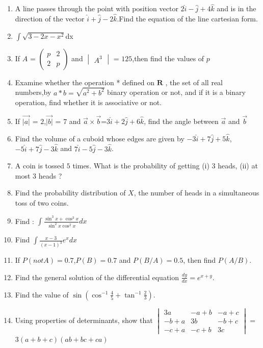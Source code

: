 \documentclass[12pt,-letter paper]{article}
\providecommand{\brak}[1]{\ensuremath{\left(#1\right)}}
\theoremstyle{remark}
\newcommand{\myvec}[1]{\ensuremath{\begin{pmatrix}#1\end{pmatrix}}}
\newcommand{\mydet}[1]{\ensuremath{\begin{vmatrix}#1\end{vmatrix}}}
\begin{document}
\begin{enumerate}
\item A line passes through the point with position vector $2\hat{i}-\hat{j}+4\hat{k}$
and is in the direction of the vector $\hat{i}+\hat{j}-2\hat{k}$.Find the equation of the line cartesian form.

\item $\int{\sqrt{3-2x-x^2}}$dx

\item If $A$ = $\myvec{p&2 \\ 2&p}$ and $\mydet{A^3}$ = $125$,then find the values of $p$

\item Examine whether the operation * defined on $\textbf{R}$ , the set of all real numbers,by $a *b = \sqrt{a^2+b^2}$ binary operation or not, and if it is a binary operation, find whether it is associative or not.

\item If $\overrightarrow{|a|}$ = $2$,$\overrightarrow{|b|}$ = $7$ and 
$\overrightarrow{a}\times\overrightarrow{b}$=$3\hat{i}+2\hat{j}+6\hat{k}$, find the angle between $\overrightarrow{a}$ and $\overrightarrow{b}$

\item Find the volume of a cuboid whose edges are given by $-3\hat{i}+7\hat{j}+5\hat{k}$,$-5\hat{i}+7\hat{j}-3\hat{k}$ and $7\hat{i}-5\hat{j}-3\hat{k}$.

\item A coin is tossed $5$ times. What is the probability of getting (i) $3$ heads,
(ii) at most $3$ heads ?

\item Find the probability distribution of $X$, the number of heads in a
simultaneous toss of two coins.

\item Find : $\int{\frac{\sin^3{x}+\cos^3{x}}{\sin^2{x}\cos^2{x}}}dx$

\item Find $\int{\frac{x-3}{\brak{x-1}^3}}e^x dx$

\item If $P(not A) =0.7$,$P(B)=0.7$ and $P(B/A)=0.5$, then find $P(A/B)$.

\item Find the general solution of the differential equation $\frac{dy}{dx} = e^{x+y}$.

\item Find the value of $\sin\brak{\cos^{-1}{\frac{4}{5}}+{\tan^{-1}{\frac{2}{3}}}}$.

\item Using properties of determinants, show that \mydet{3a & -a+b & -a+c \\ -b+a & 3b & -b+c \\ -c+a & -c+b & 3c} = 3\brak{a+b+c}\brak{ab+bc+ca}


\end{enumerate}
\end{document}
